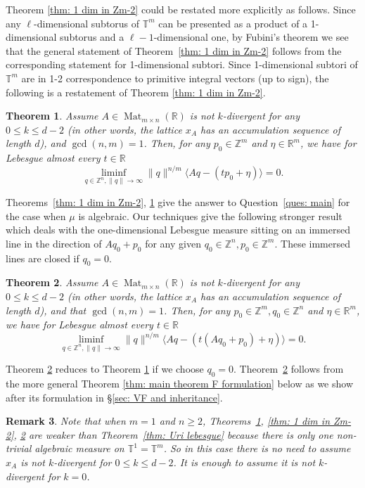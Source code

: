 \documentclass[reqno,11pt, twoside]{amsart}
\theoremstyle{plain}
\newtheorem{thm}{Theorem}[section]
\newtheorem{rem}[thm]{Remark}
\theoremstyle{definition}
\theoremstyle{definition}
\theoremstyle{remark}
\numberwithin{equation}{section}
\newcommand{\R}{{\mathbb{R}}}
\newcommand{\Z}{{\mathbb{Z}}}
\newcommand{\bR}{\mathbb{R}}
\newcommand{\bZ}{\mathbb{Z}}
\newcommand{\bT}{\mathbb{T}}
\newcommand\norm[1]{\|#1\|}
\newcommand\on[1]{\operatorname{#1}}
\begin{document}
Theorem \ref{thm: 1 dim in Zm-2} could be restated more explicitly as follows. Since any $\ell$-dimensional subtorus of $\bT^m$ can be presented as a product of a 1-dimensional subtorus and a $\ell-1$-dimensional one, by Fubini's theorem we see that the general statement of Theorem~\ref{thm: 1 dim in Zm-2} 
follows from the corresponding statement for 1-dimensional subtori. Since 1-dimensional subtori of $\bT^m$ are in 1-2 correspondence to primitive integral vectors (up to sign), the following is a restatement of Theorem
\ref{thm: 1 dim in Zm-2}.
\begin{thm}\label{thm: 1 dim in Zm}
Assume $A\in \on{Mat}_{m\times n}(\bR)$ is not $k$-divergent for any $0\le k\le 
d-2$ (in other words, the lattice $x_A$ has an accumulation sequence of length $d$), and $\gcd(n,m)=1$. Then,    
for any $p_0 \in \Z^m$ and $\eta \in \R^m$, we have for Lebesgue almost every $t \in \R$
    \begin{equation*}
        \liminf_{q\in \bZ^n, \norm{q}\to\infty} \norm{q}^{n/m} \langle Aq - (tp_0 + \eta)\rangle = 0.
    \end{equation*}
\end{thm}


Theorems~\ref{thm: 1 dim in Zm-2}, \ref{thm: 1 dim in Zm} give the answer to Question~\ref{ques: main} for the case when $\mu$ is algebraic. Our techniques give the following stronger result which deals with the one-dimensional Lebesgue measure sitting on an immersed line in the direction of $Aq_0+p_0$ for any given $q_0\in \bZ^n, p_0\in \bZ^m.$ 
These immersed lines are closed if $q_0 = 0$. 
\begin{thm}\label{thm: 1 dim in theta}
    Assume $A\in \on{Mat}_{m\times n}(\bR)$ is not $k$-divergent for any 
    $0\le k\le d-2$ (in other words, the lattice $x_A$ has an accumulation sequence of length $d$), and that $\gcd(n,m)=1$. Then, for any $p_0\in \bZ^m, q_0\in \bZ^n$ and $\eta \in \R^m$, we have for Lebesgue almost every $t \in \R$
    \begin{equation*}
        \liminf_{q\in \bZ^n, \norm{q}\to\infty} \norm{q}^{n/m} \langle Aq - (t(Aq_0+p_0) +  \eta)\rangle = 0.
    \end{equation*}
\end{thm}
Theorem \ref{thm: 1 dim in theta} reduces to  Theorem \ref{thm: 1 dim in Zm} if we choose $q_0=0$. Theorem~\ref{thm: 1 dim in theta} follows from the more general Theorem \ref{thm: main theorem F formulation} below as we show after its formulation in \S\ref{sec: VF and inheritance}.
\begin{rem}
    Note that when $m=1$ and $n\ge 2$, Theorems~\ref{thm: 1 dim in Zm}, \ref{thm: 1 dim in Zm-2}, \ref{thm: 1 dim in theta} are weaker than Theorem~\ref{thm: Uri lebesgue} because there is only one non-trivial 
    algebraic measure on $\bT^1=\bT^m$. So in this case there is no need to assume $x_A$ is not $k$-divergent for $0\le k\le d-2$. It is enough to assume 
    it is not $k$-divergent for $k=0$. 
\end{rem}
\end{document}
